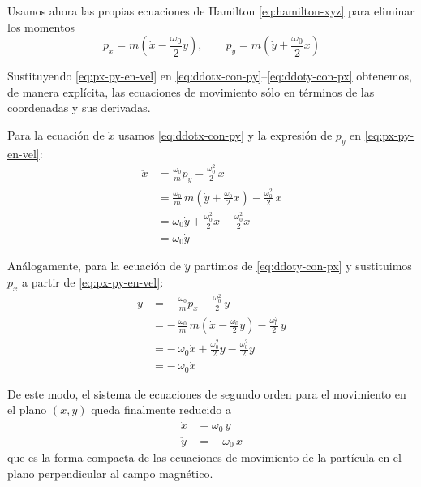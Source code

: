 \documentclass{article}
\begin{document}
Usamos ahora las propias ecuaciones de Hamilton
\eqref{eq:hamilton-xyz} para eliminar los momentos
\begin{equation}
p_{x} = m\left(\dot{x} - \frac{\omega_{0}}{2}y\right),
\qquad
p_{y} = m\left(\dot{y} + \frac{\omega_{0}}{2}x\right)
\label{eq:px-py-en-vel}
\end{equation}

Sustituyendo \eqref{eq:px-py-en-vel} en
\eqref{eq:ddotx-con-py}–\eqref{eq:ddoty-con-px} obtenemos, de manera explícita,
las ecuaciones de movimiento sólo en términos de las coordenadas y sus
derivadas.  

Para la ecuación de $\ddot{x}$ usamos
\eqref{eq:ddotx-con-py} y la expresión de $p_{y}$ en
\eqref{eq:px-py-en-vel}:
\begin{equation}
\begin{split}
\ddot{x}
&= \frac{\omega_{0}}{m}p_{y}
   - \frac{\omega_{0}^{2}}{2}\,x \\[4pt]
&= \frac{\omega_{0}}{m}\,
   m\left(\dot{y} + \frac{\omega_{0}}{2}x\right)
   - \frac{\omega_{0}^{2}}{2}\,x \\[4pt]
&= \omega_{0}\dot{y}
   + \frac{\omega_{0}^{2}}{2}x
   - \frac{\omega_{0}^{2}}{2}x \\[4pt]
&= \omega_{0}\dot{y}
\end{split}
\label{eq:ddotx-solo-vel}
\end{equation}

Análogamente, para la ecuación de $\ddot{y}$ partimos de
\eqref{eq:ddoty-con-px} y sustituimos $p_{x}$ a partir de
\eqref{eq:px-py-en-vel}:
\begin{equation}
\begin{split}
\ddot{y}
&= -\,\frac{\omega_{0}}{m}p_{x}
   - \frac{\omega_{0}^{2}}{2}\,y \\[4pt]
&= -\,\frac{\omega_{0}}{m}\,
   m\left(\dot{x} - \frac{\omega_{0}}{2}y\right)
   - \frac{\omega_{0}^{2}}{2}\,y \\[4pt]
&= -\,\omega_{0}\dot{x}
   + \frac{\omega_{0}^{2}}{2}y
   - \frac{\omega_{0}^{2}}{2}y \\[4pt]
&= -\,\omega_{0}\dot{x}
\end{split}
\label{eq:ddoty-solo-vel}
\end{equation}

De este modo, el sistema de ecuaciones de segundo orden para el movimiento en
el plano $(x,y)$ queda finalmente reducido a
\begin{equation}
\begin{split}
\ddot{x} &= \omega_{0}\,\dot{y} \\[4pt]
\ddot{y} &= -\,\omega_{0}\,\dot{x}
\end{split}
\label{eq:edo-xy-magnetico}
\end{equation}
que es la forma compacta de las ecuaciones de movimiento de la partícula en el
plano perpendicular al campo magnético.
\end{document}
